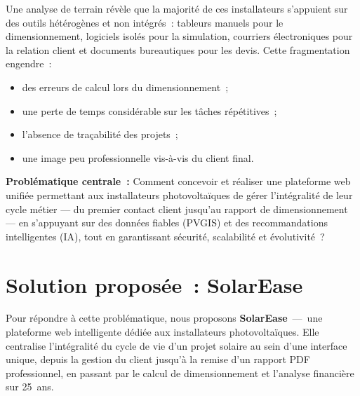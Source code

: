 Une analyse de terrain révèle que la majorité de ces installateurs s'appuient
sur des outils hétérogènes et non intégrés~: tableurs manuels pour le
dimensionnement, logiciels isolés pour la simulation, courriers électroniques
pour la relation client et documents bureautiques pour les devis. Cette
fragmentation engendre~:
\begin{itemize}
  \item des erreurs de calcul lors du dimensionnement~;
  \item une perte de temps considérable sur les tâches répétitives~;
  \item l'absence de traçabilité des projets~;
  \item une image peu professionnelle vis-à-vis du client final.
\end{itemize}

\begin{tcolorbox}[
  enhanced, colback=isetblue!7, colframe=isetblue,
  arc=4pt, boxrule=0.6pt,
  left=12pt, right=12pt, top=10pt, bottom=10pt,
  fontupper=\normalsize\itshape\color{isetblue!80!black}
]
\textbf{Problématique centrale~:} Comment concevoir et réaliser une plateforme
web unifiée permettant aux installateurs photovoltaïques de gérer l'intégralité
de leur cycle métier --- du premier contact client jusqu'au rapport de
dimensionnement --- en s'appuyant sur des données fiables (PVGIS) et des
recommandations intelligentes (IA), tout en garantissant sécurité, scalabilité
et évolutivité~?
\end{tcolorbox}

\section*{Solution proposée~: SolarEase}

Pour répondre à cette problématique, nous proposons \textbf{SolarEase}~---~une
plateforme web intelligente dédiée aux installateurs photovoltaïques. Elle
centralise l'intégralité du cycle de vie d'un projet solaire au sein d'une
interface unique, depuis la gestion du client jusqu'à la remise d'un rapport
PDF professionnel, en passant par le calcul de dimensionnement et l'analyse
financière sur 25~ans.

